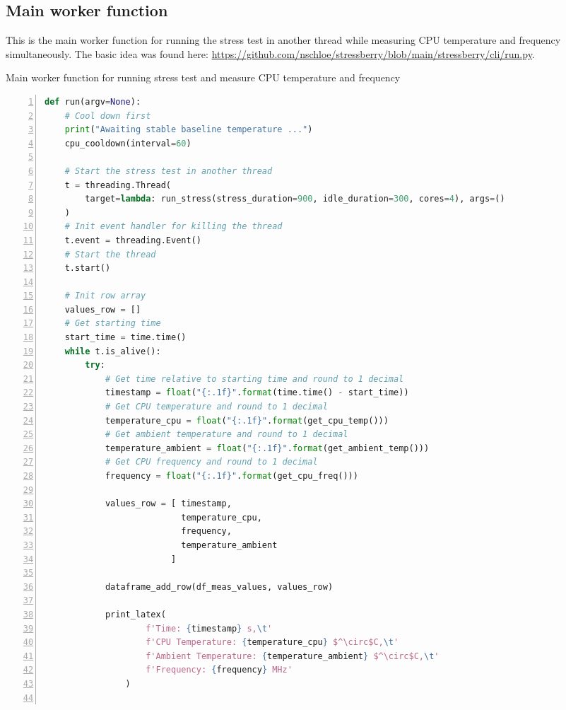 \documentclass[10pt,parskip=half,
toc=sectionentrywithdots,
bibliography=totocnumbered,
captions=tableheading,numbers=noendperiod]{scrartcl}
\begin{document}
\hypertarget{main-worker-function}{%
\subsection{Main worker function}\label{main-worker-function}}

This is the main worker function for running the stress test in another
thread while measuring CPU temperature and frequency simultaneously. The
basic idea was found here:
\url{https://github.com/nschloe/stressberry/blob/main/stressberry/cli/run.py}.

\begin{codecell}[H]
\caption{Main worker function for running stress test and measure CPU temperature
and frequency}
\label{code:f_main_worker}
\begin{lstlisting}[language=Python,numbers=left,xleftmargin=20pt,xrightmargin=5pt,belowskip=5pt,aboveskip=5pt]
def run(argv=None):
    # Cool down first
    print("Awaiting stable baseline temperature ...")
    cpu_cooldown(interval=60)

    # Start the stress test in another thread
    t = threading.Thread(
        target=lambda: run_stress(stress_duration=900, idle_duration=300, cores=4), args=()
    )
    # Init event handler for killing the thread
    t.event = threading.Event()
    # Start the thread
    t.start()

    # Init row array
    values_row = []
    # Get starting time
    start_time = time.time()
    while t.is_alive():
        try:
            # Get time relative to starting time and round to 1 decimal
            timestamp = float("{:.1f}".format(time.time() - start_time))
            # Get CPU temperature and round to 1 decimal
            temperature_cpu = float("{:.1f}".format(get_cpu_temp()))
            # Get ambient temperature and round to 1 decimal
            temperature_ambient = float("{:.1f}".format(get_ambient_temp()))
            # Get CPU frequency and round to 1 decimal
            frequency = float("{:.1f}".format(get_cpu_freq()))

            values_row = [ timestamp,
                           temperature_cpu,
                           frequency,
                           temperature_ambient
                         ]

            dataframe_add_row(df_meas_values, values_row)

            print_latex(
                    f'Time: {timestamp} s,\t'
                    f'CPU Temperature: {temperature_cpu} $^\circ$C,\t'
                    f'Ambient Temperature: {temperature_ambient} $^\circ$C,\t'
                    f'Frequency: {frequency} MHz'
                )


\end{lstlisting}
\end{codecell}
\end{document}
